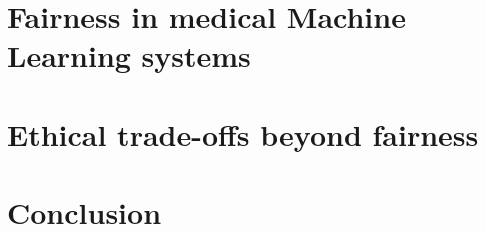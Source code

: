 \documentclass[11pt,english]{article}
\begin{document}
\section{Fairness in medical Machine Learning systems}
\label{combination}


\section{Ethical trade-offs beyond fairness}
\label{new_tradeoff}


\section{Conclusion}
\label{conclusions}

 
%
\clearpage




\printbibliography
\end{document}
